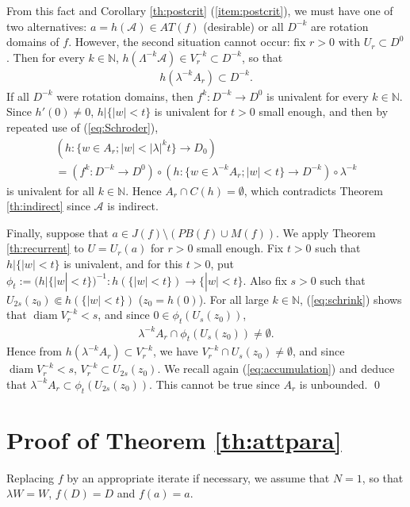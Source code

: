 \documentclass[a4paper,12pt]{amsart}
\theoremstyle{plain}
\theoremstyle{definition}
\theoremstyle{remark}
\numberwithin{equation}{section}
\begin{document}
From this fact and Corollary \ref{th:postcrit} (\ref{item:postcrit}),
we must have one of two alternatives: 
$a=h(\mathcal{A})\in{\mathit{AT}}(f)$ (desirable) or
all $D^{-k}$ are rotation domains of $f$.
However, the second situation cannot occur: fix $r>0$ with $U_r\subset D^0$. 
Then for every $k\in{\mathbb{N}}$, 
$h(\Lambda^{-k}\mathcal{A})\in V^{-k}_r\subset D^{-k}$, so that
\begin{gather*}
 h(\lambda^{-k}A_r)\subset D^{-k}.
\end{gather*}
If all $D^{-k}$ were rotation domains, then 
$f^k:D^{-k}\to D^0$ is univalent for every $k\in{\mathbb{N}}$.
Since $h'(0)\neq 0$, $h|\{|w|<t\}$ is univalent for $t>0$ small enough,
and then by repeated use of (\ref{eq:Schroder}),
\begin{multline*}
 (h:\{w\in A_r;|w|<|\lambda|^kt\}\to D_0)\\
=(f^k:D^{-k}\to D^0)\circ(h:\{w\in\lambda^{-k}A_r;|w|<t\}\to D^{-k})
\circ\lambda^{-k}
\end{multline*}
is univalent for all $k\in{\mathbb{N}}$. Hence $A_r\cap C(h)=\emptyset$,
which contradicts Theorem \ref{th:indirect} since $\mathcal{A}$ is indirect.

Finally, suppose that $a\in J(f)\setminus({\mathit{PB}}(f)\cup M(f))$.
We apply Theorem \ref{th:recurrent} to $U=U_r(a)$ for $r>0$ small enough.
Fix $t>0$ such that $h|\{|w|<t\}$ is univalent, and for this $t>0$,
put $\phi_t:=(h|\{|w|<t\})^{-1}:h(\{|w|<t\})\to\{|w|<t\}$.
Also fix $s>0$ such that $U_{2s}(z_0)\Subset h(\{|w|<t\})$
($z_0=h(0)$).
For all large $k\in{\mathbb{N}}$, (\ref{eq:schrink}) shows that 
${\operatorname{diam}} V^{-k}_r<s$, and since $0\in\phi_t(U_s(z_0))$,
\begin{gather}
 \lambda^{-k}A_r\cap\phi_t(U_s(z_0))\neq\emptyset.\label{eq:accumulation}
\end{gather} 
Hence from $h(\lambda^{-k}A_r)\subset V^{-k}_r$, we have
$V^{-k}_r\cap U_s(z_0)\neq\emptyset$, and since ${\operatorname{diam}} V^{-k}_r<s$,
$V^{-k}_r\subset U_{2s}(z_0)$.
We recall again (\ref{eq:accumulation}) and deduce that
$\lambda^{-k}A_r\subset\phi_t(U_{2s}(z_0))$. This cannot be true
since $A_r$ is unbounded. \qed

\section{Proof of Theorem \ref{th:attpara}}\label{eq:asympath}
Replacing $f$ by an appropriate iterate if necessary,
we assume that $N=1$, so that $\lambda W=W$, $f(D)=D$ and $f(a)=a$.
\end{document}
